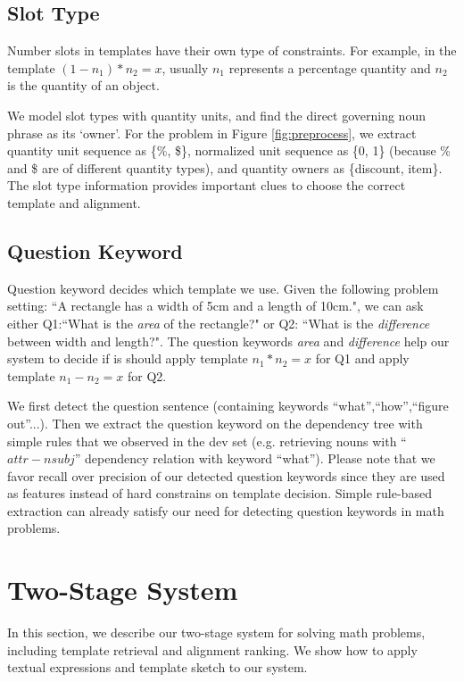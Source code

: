 \documentclass[11pt,letterpaper]{article}
\begin{document}
\subsection{Slot Type}
\label{subsec:slotType}
Number slots in templates have their own type of constraints. For example, in the template $(1-n_1)*n_2=x$, usually $n_1$ represents a percentage quantity and $n_2$ is the quantity of an object.

We model slot types with quantity units, and find the direct governing noun phrase as its `owner'. For the problem in Figure \ref{fig:preprocess}, we extract quantity unit sequence as \{\%, \$\}, normalized unit sequence as \{0, 1\} (because \% and \$ are of different quantity types), and quantity owners as \{discount, item\}. The slot type information provides important clues to choose the correct template and alignment.

\subsection{Question Keyword}
Question keyword decides which template we use. Given the following problem setting: ``A rectangle has a width of 5cm and a length of 10cm.", we can ask either Q1:``What is the {\it area} of the rectangle?" or Q2: ``What is the {\it difference} between width and length?". The question keywords {\it area} and {\it difference} help our system to decide if is should apply template $n_1*n_2=x$ for Q1 and apply template $n_1-n_2=x$ for Q2.

We first detect the question sentence (containing keywords ``what'',``how'',``figure out''...). Then we extract the question keyword on the dependency tree with simple rules that we observed in the dev set (e.g. retrieving nouns with ``$attr-nsubj$'' dependency relation with keyword ``what''). Please note that we favor recall over precision of our detected question keywords since they are used as features instead of hard constrains on template decision. Simple rule-based extraction can already satisfy our need for detecting question keywords in math problems.

\section{Two-Stage System}
\label{sec:ourSystem}

In this section, we describe our two-stage system for solving math problems, including template retrieval and alignment ranking. We show how to apply textual expressions and template sketch to our system.
\end{document}
